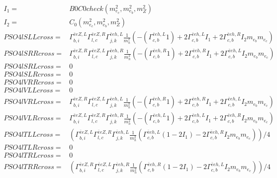 \documentclass[A4,landscape]{article}
\begin{document}
\begin{align} 
I_1= & B0C0check(m^2_{e_{{c}}}, m^2_{e_{{b}}}, m^2_{Z}) \\ 
I_2= & C_0(m^2_{e_{{c}}}, m^2_{e_{{b}}}, m^2_{Z}) \\ 
  PSO4lSLLcross= &  \Gamma^{\bar{e}e Z ,L}_{b, i} \Gamma^{\bar{e}e Z ,R}_{l, c} \Gamma^{\bar{e}e h ,L}_{j, k} \frac{1}{m^2_{h}} (-(\Gamma^{\bar{e}e h ,L}_{c, b} 1) + 2 \Gamma^{\bar{e}e h ,L}_{c, b} I_1 + 2 \Gamma^{\bar{e}e h ,R}_{c, b} I_2 m_{e_{{b}}} m_{e_{{c}}}) \\ 
  PSO4lSRRcross= &  \Gamma^{\bar{e}e Z ,R}_{b, i} \Gamma^{\bar{e}e Z ,L}_{l, c} \Gamma^{\bar{e}e h ,R}_{j, k} \frac{1}{m^2_{h}} (-(\Gamma^{\bar{e}e h ,R}_{c, b} 1) + 2 \Gamma^{\bar{e}e h ,R}_{c, b} I_1 + 2 \Gamma^{\bar{e}e h ,L}_{c, b} I_2 m_{e_{{b}}} m_{e_{{c}}}) \\ 
  PSO4lSRLcross= & 0 \\ 
  PSO4lSLRcross= & 0 \\ 
  PSO4lVRRcross= & 0 \\ 
  PSO4lVLLcross= & 0 \\ 
  PSO4lVRLcross= &  \Gamma^{\bar{e}e Z ,R}_{b, i} \Gamma^{\bar{e}e Z ,L}_{l, c} \Gamma^{\bar{e}e h ,L}_{j, k} \frac{1}{m^2_{h}} (-(\Gamma^{\bar{e}e h ,R}_{c, b} 1) + 2 \Gamma^{\bar{e}e h ,R}_{c, b} I_1 + 2 \Gamma^{\bar{e}e h ,L}_{c, b} I_2 m_{e_{{b}}} m_{e_{{c}}}) \\ 
  PSO4lVLRcross= &  \Gamma^{\bar{e}e Z ,L}_{b, i} \Gamma^{\bar{e}e Z ,R}_{l, c} \Gamma^{\bar{e}e h ,R}_{j, k} \frac{1}{m^2_{h}} (-(\Gamma^{\bar{e}e h ,L}_{c, b} 1) + 2 \Gamma^{\bar{e}e h ,L}_{c, b} I_1 + 2 \Gamma^{\bar{e}e h ,R}_{c, b} I_2 m_{e_{{b}}} m_{e_{{c}}}) \\ 
  PSO4lTLLcross= & ( \Gamma^{\bar{e}e Z ,L}_{b, i} \Gamma^{\bar{e}e Z ,R}_{l, c} \Gamma^{\bar{e}e h ,L}_{j, k} \frac{1}{m^2_{h}} (\Gamma^{\bar{e}e h ,L}_{c, b} (1 - 2 I_1) - 2 \Gamma^{\bar{e}e h ,R}_{c, b} I_2 m_{e_{{b}}} m_{e_{{c}}}))/4 \\ 
  PSO4lTLRcross= & 0 \\ 
  PSO4lTRLcross= & 0 \\ 
  PSO4lTRRcross= & ( \Gamma^{\bar{e}e Z ,R}_{b, i} \Gamma^{\bar{e}e Z ,L}_{l, c} \Gamma^{\bar{e}e h ,R}_{j, k} \frac{1}{m^2_{h}} (\Gamma^{\bar{e}e h ,R}_{c, b} (1 - 2 I_1) - 2 \Gamma^{\bar{e}e h ,L}_{c, b} I_2 m_{e_{{b}}} m_{e_{{c}}}))/4 \\ 
\end{align} 
\end{document}

